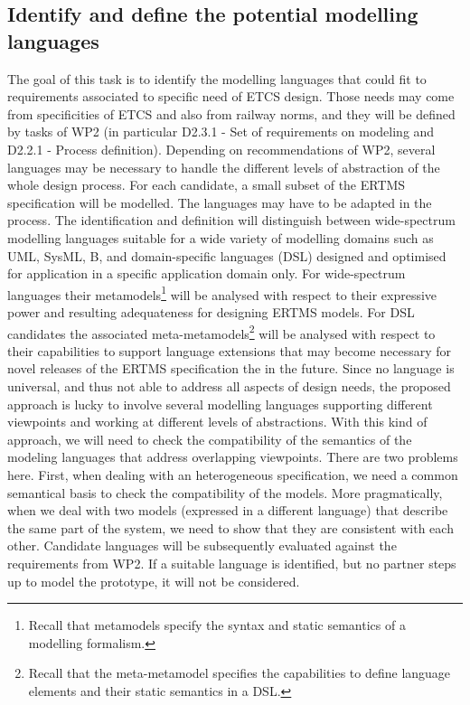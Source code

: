 \documentclass{template/openetcs_article}
\begin{document}
\subsection{Identify and define the potential modelling languages}
\label{sec:language}

The goal of this task is to identify the modelling languages that
could fit to requirements associated to specific need of ETCS
design. Those needs may come from specificities of ETCS and also from
railway norms, and they will be defined by tasks of WP2 
(in particular D2.3.1 - Set of requirements on modeling and D2.2.1 - Process definition). Depending on recommendations of WP2, several languages may
be necessary to handle the different levels of abstraction of the
whole design process.  For each candidate, a small subset of the ERTMS
specification will be modelled. The languages may have to be adapted
in the process. The identification and definition will distinguish
between wide-spectrum modelling languages suitable for a wide variety
of modelling domains such as UML, SysML, B, and domain-specific
languages (DSL) designed and optimised for application in a specific
application domain only.  For wide-spectrum languages their
metamodels\footnote{Recall that metamodels specify the syntax and
  static semantics of a modelling formalism.} will be analysed with
respect to their expressive power and resulting adequateness for
designing ERTMS models.  For DSL candidates the associated
meta-metamodels\footnote{Recall that the meta-metamodel specifies the
  capabilities to define language elements and their static semantics
  in a DSL.}  will be analysed with respect to their capabilities to
support language extensions that may become necessary for novel
releases of the ERTMS specification the in the future.  Since no
language is universal, and thus not able to address all aspects of
design needs, the proposed approach is lucky to involve several
modelling languages supporting different viewpoints and working at
different levels of abstractions. With this kind of approach, we will
need to check the compatibility of the semantics of the modeling
languages that address overlapping viewpoints. There are two problems
here. First, when dealing with an heterogeneous specification, we need
a common semantical basis to check the compatibility of the
models. More pragmatically, when we deal with two models (expressed in
a different language) that describe the same part of the system, we
need to show that they are consistent with each other. Candidate
languages will be subsequently evaluated against the requirements from
WP2.  If a suitable language is identified, but no partner steps up to
model the prototype, it will not be considered.
\end{document}
